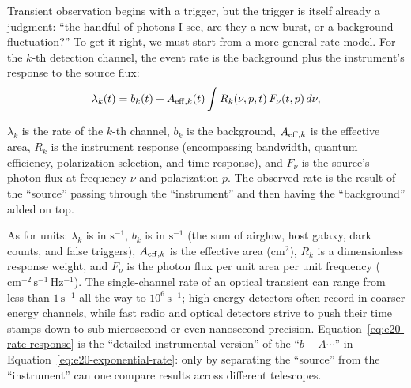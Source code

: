 Transient observation begins with a trigger, but the trigger is itself already a judgment: ``the handful of photons I see, are they a new burst, or a background fluctuation?'' To get it right, we must start from a more general rate model. For the \(k\)-th detection channel, the event rate is the background plus the instrument's response to the source flux:
\begin{equation}
  \lambda_k(t)=b_k(t)+A_{{\rm eff},k}(t)
  \int R_k(\nu,p,t)\,F_\nu(t,p)\,d\nu ,
  \label{eq:e20-rate-response}
\end{equation}
\begin{formulaexplain}
\(\lambda_k\) is the rate of the \(k\)-th channel, \(b_k\) is the background, \(A_{{\rm eff},k}\) is the effective area, \(R_k\) is the instrument response (encompassing bandwidth, quantum efficiency, polarization selection, and time response), and \(F_\nu\) is the source's photon flux at frequency \(\nu\) and polarization \(p\). The observed rate is the result of the ``source'' passing through the ``instrument'' and then having the ``background'' added on top.
\end{formulaexplain}
As for units: \(\lambda_k\) is in \(\mathrm{s^{-1}}\), \(b_k\) is in \(\mathrm{s^{-1}}\) (the sum of airglow, host galaxy, dark counts, and false triggers), \(A_{{\rm eff},k}\) is the effective area (\(\mathrm{cm^2}\)), \(R_k\) is a dimensionless response weight, and \(F_\nu\) is the photon flux per unit area per unit frequency (\(\mathrm{cm^{-2}\,s^{-1}\,Hz^{-1}}\)). The single-channel rate of an optical transient can range from less than \(1\,\mathrm{s^{-1}}\) all the way to \(10^6\,\mathrm{s^{-1}}\); high-energy detectors often record in coarser energy channels, while fast radio and optical detectors strive to push their time stamps down to sub-microsecond or even nanosecond precision. Equation~\eqref{eq:e20-rate-response} is the ``detailed instrumental version'' of the ``\(b+A\cdots\)'' in Equation~\eqref{eq:e20-exponential-rate}: only by separating the ``source'' from the ``instrument'' can one compare results across different telescopes.

